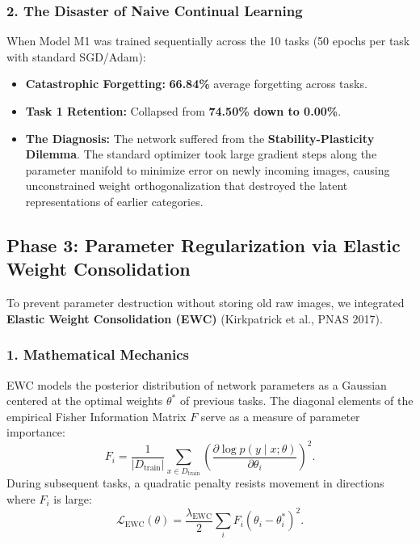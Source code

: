 \documentclass[11pt,a4paper]{article}
\begin{document}
    \subsubsection{2. The Disaster of Naive Continual Learning}
    When Model M1 was trained sequentially across the 10 tasks (50 epochs per task with standard SGD/Adam):
    \begin{itemize}[leftmargin=*]
        \item \textbf{Catastrophic Forgetting:} \textbf{66.84\%} average forgetting across tasks.
        \item \textbf{Task 1 Retention:} Collapsed from \textbf{74.50\% down to 0.00\%}.
        \item \textbf{The Diagnosis:} The network suffered from the \textbf{Stability-Plasticity Dilemma}. The standard optimizer took large gradient steps along the parameter manifold to minimize error on newly incoming images, causing unconstrained weight orthogonalization that destroyed the latent representations of earlier categories.
    \end{itemize}

    \subsection{Phase 3: Parameter Regularization via Elastic Weight Consolidation}
    To prevent parameter destruction without storing old raw images, we integrated \textbf{Elastic Weight Consolidation (EWC)} (Kirkpatrick et al., PNAS 2017).

    \subsubsection{1. Mathematical Mechanics}
    EWC models the posterior distribution of network parameters as a Gaussian centered at the optimal weights $\theta^*$ of previous tasks. The diagonal elements of the empirical Fisher Information Matrix $F$ serve as a measure of parameter importance:
    \begin{equation}
        F_{i} = \frac{1}{|D_{\text{train}}|} \sum_{x \in D_{\text{train}}} \left( \frac{\partial \log p(y \mid x; \theta)}{\partial \theta_i} \right)^2.
    \end{equation}
    During subsequent tasks, a quadratic penalty resists movement in directions where $F_i$ is large:
    \begin{equation}
        \mathcal{L}_{\text{EWC}}(\theta) = \frac{\lambda_{\text{EWC}}}{2} \sum_{i} F_i (\theta_i - \theta_i^*)^2.
    \end{equation}
\end{document}
